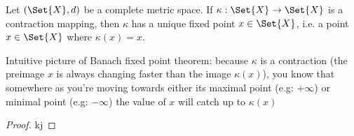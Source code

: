 \begin{thm}
  Let $(\Set{X}, d)$ be a complete metric space. If $\kappa: \Set{X} \rightarrow \Set{X}$ is a contraction mapping, then $\kappa$ has a unique fixed point $x \in \Set{X}$, i.e. a point $x \in \Set{X}$ where $\kappa(x) = x$.
\end{thm}

\begin{rem}
  Intuitive picture of Banach fixed point theorem: because $\kappa$ is a contraction (the preimage $x$ is always changing faster than the image $\kappa(x)$), you know that somewhere as you're moving towards either its maximal point (e.g: $+\infty$) or minimal point (e.g: $-\infty$) the value of $x$ will catch up to $\kappa(x)$
\end{rem}

\begin{proof}
  kj
\end{proof}
